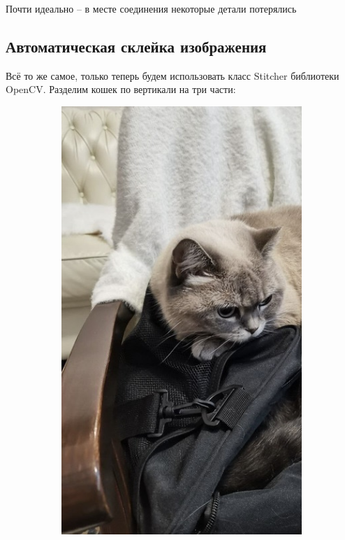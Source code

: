 \documentclass[a4paper, 16pt]{article}
\begin{document}
\noindent Почти идеально -- в месте соединения некоторые детали потерялись


\subsection{Автоматическая склейка изображения}
\noindent Всё то же самое, только теперь будем использовать класс Stitcher библиотеки OpenCV.
Разделим кошек по вертикали на три части:
\begin{figure}[!htb]
    \centering
    \begin{subfigure}[b]{0.3\textwidth}
        \centering
        \includegraphics[width=\textwidth]{I1.jpg}

\end{subfigure}
\end{figure}
\end{document}
